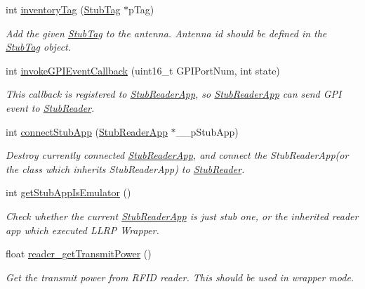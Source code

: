 \begin{DoxyCompactItemize}
int \hyperlink{class_e_l_f_i_n_1_1_stub_reader_a74111fbef137ef6af88174a8df5c92a1}{inventory\-Tag} (\hyperlink{class_e_l_f_i_n_1_1_stub_tag}{Stub\-Tag} $\ast$p\-Tag)
\begin{DoxyCompactList}\small\item\em Add the given \hyperlink{class_e_l_f_i_n_1_1_stub_tag}{Stub\-Tag} to the antenna. Antenna id should be defined in the \hyperlink{class_e_l_f_i_n_1_1_stub_tag}{Stub\-Tag} object. \end{DoxyCompactList}\item 
int \hyperlink{class_e_l_f_i_n_1_1_stub_reader_a2007cb9835b37c68409bde94ca1b27cd}{invoke\-G\-P\-I\-Event\-Callback} (uint16\-\_\-t G\-P\-I\-Port\-Num, int state)
\begin{DoxyCompactList}\small\item\em This callback is registered to \hyperlink{class_e_l_f_i_n_1_1_stub_reader_app}{Stub\-Reader\-App}, so \hyperlink{class_e_l_f_i_n_1_1_stub_reader_app}{Stub\-Reader\-App} can send G\-P\-I event to \hyperlink{class_e_l_f_i_n_1_1_stub_reader}{Stub\-Reader}. \end{DoxyCompactList}\item 
int \hyperlink{class_e_l_f_i_n_1_1_stub_reader_a1efbd7ee1156552ad521965b425026e2}{connect\-Stub\-App} (\hyperlink{class_e_l_f_i_n_1_1_stub_reader_app}{Stub\-Reader\-App} $\ast$\-\_\-\-\_\-p\-Stub\-App)
\begin{DoxyCompactList}\small\item\em Destroy currently connected \hyperlink{class_e_l_f_i_n_1_1_stub_reader_app}{Stub\-Reader\-App}, and connect the Stub\-Reader\-App(or the class which inherits Stub\-Reader\-App) to \hyperlink{class_e_l_f_i_n_1_1_stub_reader}{Stub\-Reader}. \end{DoxyCompactList}\item 
int \hyperlink{class_e_l_f_i_n_1_1_stub_reader_a2a0e3d35aa7de42bbb3c07e6ea53c4e4}{get\-Stub\-App\-Is\-Emulator} ()
\begin{DoxyCompactList}\small\item\em Check whether the current \hyperlink{class_e_l_f_i_n_1_1_stub_reader_app}{Stub\-Reader\-App} is just stub one, or the inherited reader app which executed L\-L\-R\-P Wrapper. \end{DoxyCompactList}\item 
float \hyperlink{class_e_l_f_i_n_1_1_stub_reader_a9ebe11589f668d845e10a889d2685a25}{reader\-\_\-get\-Transmit\-Power} ()
\begin{DoxyCompactList}\small\item\em Get the transmit power from R\-F\-I\-D reader. This should be used in wrapper mode. \end{DoxyCompactList}\item 

\end{DoxyCompactItemize}
